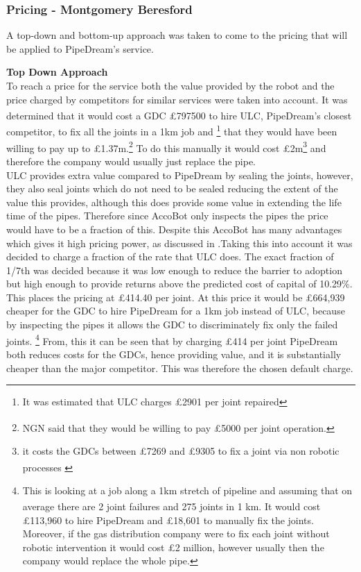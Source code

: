 \documentclass[11pt]{article}		%
\newcommand{\supercite}[1]{\textsuperscript{\cite{#1}}}		%
\begin{document}
            \subsubsection[Pricing]{Pricing - Montgomery Beresford} \label{revenue_model}
                    
                    A top-down and bottom-up approach was taken to come to the pricing that will be applied to PipeDream's service.
                    
                        
                    	\textbf{Top Down Approach}
                    	\\
                     To reach a price for the service both the value provided by the robot and the price charged by competitors for similar services were taken into account. 
	           It was determined that it would cost a GDC £797500 to hire ULC,\supercite{NYT} PipeDream's closest competitor, to fix all the joints in a 1km job and \footnote{It was estimated that ULC charges £2901 per joint repaired} that they would have been willing to pay up to £1.37m.\footnote{NGN said that they would be willing to pay £5000 per joint operation.\supercite{NGN}} To do this manually it would cost £2m\footnote{it costs the GDCs between £7269 and £9305 to fix a joint via non robotic processes \supercite{NYT}} and therefore the company would usually just replace the pipe.
	           \\ \hspace*{3ex}
	           ULC provides extra value compared to PipeDream by sealing the joints, however, they also seal joints which do not need to be sealed reducing the extent of the value this provides, although this does provide some value in extending the life time of the pipes. Therefore since AccoBot only inspects the pipes the price would have to be a fraction of this. Despite this AccoBot has many advantages which gives it high pricing power, as discussed in .Taking this into account it was decided to charge a fraction of the rate that ULC does. The exact fraction of 1/7th was decided because it was low enough to reduce the barrier to adoption but high enough to provide returns above the predicted cost of capital of 10.29\%. This places the pricing at £414.40 per joint. At this price it would be £664,939 cheaper for the GDC to hire PipeDream for a 1km job instead of ULC, because by inspecting the pipes it allows the GDC to discriminately fix only the failed joints. \footnote{This is looking at a job along a 1km stretch of pipeline and assuming that on average there are 2 joint failures and 275 joints in 1 km.\supercite{SGN_Southern} It would cost £113,960 to hire PipeDream and £18,601 to manually fix the joints. Moreover, if the gas distribution company were to fix each joint without robotic intervention it would cost £2 million, however usually then the company would replace the whole pipe.} From, this it can be seen that by charging £414 per joint PipeDream both reduces costs for the GDCs, hence providing value, and it is substantially cheaper than the major competitor. This was therefore the chosen default charge. 
\end{document}
